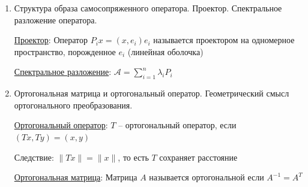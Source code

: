 \documentclass[12pt]{article}
\begin{document}
\begin{enumerate}
        6) $\mathcal{A}^*$ -- линейный оператор ($\mathcal{A}x = x^\prime, \mathcal{A}y = y^\prime \Longrightarrow \mathcal{A}(\lambda x + \mu y) = \lambda x^\prime + \mu y^\prime$)

        \hyperlink{selfconjugateoperator}{Самосопряженный оператор}: $\mathcal{A}$ называется самосопряженным, если $\mathcal{A} = \mathcal{A}^*$

        Следствие. $A^T = A \Longrightarrow$ матрица $A$ симметричная

        \hyperlink{selfconjugateoperatorproperties}{Свойства}:

        1) $\mathcal{A} = \mathcal{A}^*, \ \lambda : \ \mathcal{A}x = \lambda x (x \neq 0)$. Тогда, $\lambda \in \Real$

        2) $\mathcal{A} = \mathcal{A}^*, \ \mathcal{A}x_1 = \lambda_1 x_1, \mathcal{A}x_2 = \lambda_2 x_2$ и $\lambda_1 \neq \lambda_2$. Тогда $x_1 \perp x_2$

        \hyperlink{theoremabouteigenvectorsinselfconjugateoperator}{Теорема о базисе собственных векторов}: $\mathcal{A} = \mathcal{A}^*$ ($\mathcal{A} : V^n \to V^n$),
        тогда $\exists e_1, \dots, e_n$ -- набор собственных векторов $\mathcal{A}$ и $\Set{e_i}$ -- ортонормированный базис

        (другими словами: $\mathcal{A}$ диагонализируем)

        \item Структура образа самосопряженного оператора. Проектор. Спектральное разложение оператора.

        \hyperlink{projector}{Проектор}: Оператор $P_i x = (x, e_i) e_i$ называется проектором на одномерное пространство, порожденное $e_i$ (линейная оболочка)

        \hyperlink{spectraldecomposition}{Спектральное разложение}: $\mathcal{A} = \sum_{i = 1}^{n} \lambda_i P_i$

        \item Ортогональная матрица и ортогональный оператор. Геометрический смысл ортогонального преобразования.

        \hyperlink{orthogonaloperator}{Ортогональный оператор}: $T$ -- ортогональный оператор, если $(Tx, Ty) = (x, y)$

        Следствие: $\|Tx\| = \|x\|$, то есть $T$ сохраняет расстояние

        \hyperlink{orthogonalmatrix}{Ортогональная матрица}: Матрица $A$ называется ортогональной если $A^{-1} = A^T$




\end{enumerate}
\end{document}

